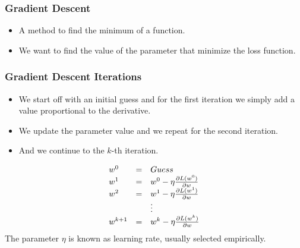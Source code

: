 \documentclass[14 pt]{beamer}
\let\olditem\item
\renewcommand{\item}{\olditem\vspace{4pt}}
\begin{document}
\begin{frame}
  \frametitle{Gradient Descent}
  \begin{itemize}
  \item A method to find the minimum of a function.
  \item We want to find the value of the parameter that minimize the loss function.
  \end{itemize}
\end{frame}

\begin{frame}
    \frametitle{Gradient Descent Iterations}
    \begin{itemize}
    \item We start off with an initial guess and for the first iteration we
      simply add a value proportional to the derivative.
    \item We update the parameter value and we repeat for the second
      iteration.
    \item And we continue to the $k$-th iteration.
    \end{itemize}
  \end{frame}
  \begin{frame}
\begin{displaymath}
    \begin{array}{{lll}}
      w^0  & =  & Guess \\
      w^1 & = & w^0 - \eta \frac{\partial L(w^0)}{\partial w} \\
      w^2 & = & w^1 - \eta \frac{\partial L(w^1)}{\partial w} \\      
&  & \vdots  \\
w^{k+1} & = & w^k - \eta \frac{\partial L(w^k)}{\partial w} \\
    \end{array}
  \end{displaymath}
The parameter $\eta$ is known as learning rate, usually selected empirically.
\end{frame}
\end{document}
